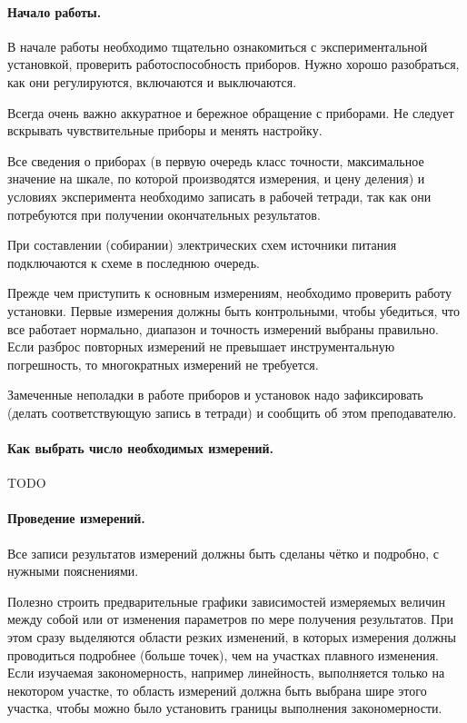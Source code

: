 \paragraph{Начало работы.}

В начале работы необходимо тщательно ознакомиться с экспериментальной
установкой, проверить работоспособность приборов. Нужно хорошо разобраться,
как они регулируются, включаются и выключаются.

Всегда очень важно аккуратное и бережное обращение с приборами. Не
следует вскрывать чувствительные приборы и менять настройку.

Все сведения о приборах (в первую очередь класс точности, максимальное
значение на шкале, по которой производятся измерения, и цену деления)
и условиях эксперимента необходимо записать в рабочей тетради, так
как они потребуются при получении окончательных результатов.

При составлении (собирании) электрических схем источники питания подключаются
к схеме в последнюю очередь.

Прежде чем приступить к основным измерениям, необходимо проверить
работу установки. Первые измерения должны быть контрольными, чтобы
убедиться, что все работает нормально, диапазон и точность измерений
выбраны правильно. Если разброс повторных измерений не превышает инструментальную
погрешность, то многократных измерений не требуется.

Замеченные неполадки в работе приборов и установок надо зафиксировать
(делать соответствующую запись в тетради) и сообщить об этом преподавателю.%


\paragraph{Как выбрать число необходимых измерений.}

TODO

\paragraph{Проведение измерений.}

Все записи результатов измерений должны быть сделаны чётко и подробно,
с нужными пояснениями.

Полезно строить предварительные графики зависимостей измеряемых величин
между собой или от изменения параметров по мере получения результатов.
При этом сразу выделяются области резких изменений, в которых измерения
должны проводиться подробнее (больше точек), чем на участках плавного
изменения. Если изучаемая закономерность, например линейность, выполняется
только на некотором участке, то область измерений должна быть выбрана
шире этого участка, чтобы можно было установить границы выполнения
закономерности.

